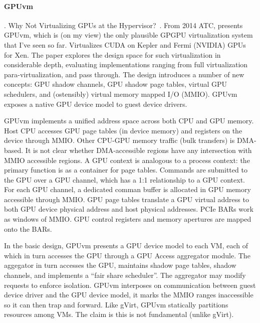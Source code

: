 \paragraph {\bf GPUvm}. Why Not Virtualizing GPUs at the Hypervisor?~\cite{Suzuki:2014:GWV:2643634.2643646}. From 2014 ATC, presents
      GPUvm, which is (on my view) the only plausible GPGPU virtualization system that I've seen so far. Virtualizes
	  CUDA on Kepler and Fermi (NVIDIA) GPUs for Xen. The paper explores the design space for such virtualization
	  in considerable depth, evaluating implementations ranging from full virtualization
	  para-virtualization, and pass through. The design introduces a number of new concepts: GPU shadow
	  channels, GPU shadow page tables, virtual GPU schedulers, and (ostensibly) virtual memory mapped I/O (MMIO).
	  GPUvm exposes a native GPU device model to guest device drivers.

	  GPUvm implements a unified address space across both CPU and GPU memory. Host CPU accesses GPU page tables (in device memory)
	  and registers on the device through MMIO. Other CPU-GPU memory traffic (bulk transfers) is DMA-based. It is not clear
	  whether DMA-accessible regions have any intersection with MMIO accessible regions. A GPU context is analogous to a process
	  context: the primary function is as a container for page tables. Commands are submitted to the GPU over a GPU channel, which
	  has a 1:1 relationship to a GPU context. For each GPU channel, a dedicated comman buffer is allocated in GPU memory
	  accessible through MMIO. GPU page tables translate a GPU virtual address to both GPU device physical address and host
      physical addresses. PCIe BARs work as windows of MMIO. GPU control registers and memory apertures are mapped onto the BARs.

	  In the basic design, GPUvm presents a GPU device model to each VM, each of which in turn accesses the GPU through a
	  GPU Access aggregator module. The aggegator in turn accesses the GPU, maintains shadow page tables, shadow
	  channels, and implements a ``fair share scheduler''. The aggregator may modify requests to enforce isolation.
	  GPUvm interposes on communication between guest device driver and the GPU device model, it marks the MMIO
	  ranges inaccessible so it can then trap and forward. Like gVirt, GPUvm statically partitions resources among VMs.
	  The claim is this is not fundamental (unlike gVirt).

